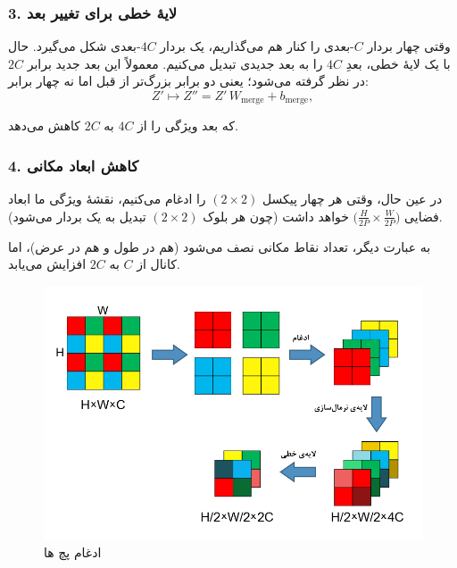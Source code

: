 \subsubsection{3. لایهٔ خطی برای تغییر بعد}
وقتی چهار بردار \(\displaystyle C\)-بعدی را کنار هم می‌گذاریم، یک بردار \(\displaystyle 4C\)-بعدی شکل می‌گیرد.  
حال با یک لایهٔ خطی، بعدِ \(\displaystyle 4C\) را به بعد جدیدی تبدیل می‌کنیم.  
معمولاً این بعد جدید برابر \(\displaystyle 2C\) در نظر گرفته می‌شود؛ 
یعنی دو برابر بزرگ‌تر از قبل اما نه چهار برابر:
\begin{equation}
	Z' \mapsto Z'' = Z' \, W_{\text{merge}} + b_{\text{merge}},
	\label{eq:merge_transform}
\end{equation}

که بعد ویژگی را از \(\displaystyle 4C\) به \(\displaystyle 2C\) کاهش می‌دهد.

\subsubsection{4. کاهش ابعاد مکانی}
در عین حال، وقتی هر چهار پیکسل \((2 \times 2)\) را ادغام می‌کنیم، 
نقشهٔ ویژگی ما ابعاد فضایی \(\bigl(\tfrac{H}{2P} \times \tfrac{W}{2P}\bigr)\) خواهد داشت 
(چون هر بلوک \((2 \times 2)\) تبدیل به یک بردار می‌شود).

به عبارت دیگر، تعداد نقاط مکانی نصف می‌شود (هم در طول و هم در عرض)، 
اما کانال از \(\displaystyle C\) به \(\displaystyle 2C\) افزایش می‌یابد.

\begin{figure}[h]
	\centering
	\begin{minipage}[b]{1\textwidth}
		\centering
		\includegraphics[width=\textwidth]{transformer_images/persian images/b12.png}
		\caption{ادغام پچ ها}
		\label{fig:patch merging in Swin Transformer}
	\end{minipage}
	\hfill
\end{figure}

